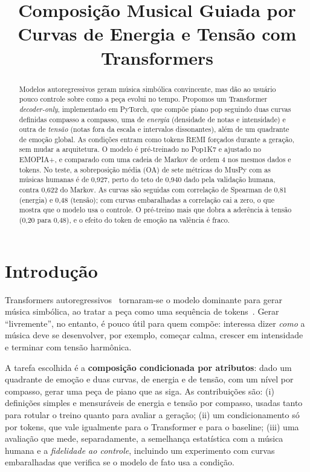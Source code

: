 \documentclass{article}
\title{Composição Musical Guiada por Curvas de Energia e Tensão com Transformers}
\begin{document}
\maketitle

\begin{abstract}
Modelos autoregressivos geram música simbólica convincente, mas dão ao usuário pouco controle sobre como a peça evolui no tempo. Propomos um Transformer \emph{decoder-only}, implementado em PyTorch, que compõe piano pop seguindo duas curvas definidas compasso a compasso, uma de \emph{energia} (densidade de notas e intensidade) e outra de \emph{tensão} (notas fora da escala e intervalos dissonantes), além de um quadrante de emoção global. As condições entram como tokens REMI forçados durante a geração, sem mudar a arquitetura. O modelo é pré-treinado no Pop1K7 e ajustado no EMOPIA+, e comparado com uma cadeia de Markov de ordem 4 nos mesmos dados e tokens. No teste, a sobreposição média (OA) de sete métricas do MusPy com as músicas humanas é de 0,927, perto do teto de 0,940 dado pela validação humana, contra 0,622 do Markov. As curvas são seguidas com correlação de Spearman de 0,81 (energia) e 0,48 (tensão); com curvas embaralhadas a correlação cai a zero, o que mostra que o modelo usa o controle. O pré-treino mais que dobra a aderência à tensão (0,20 para 0,48), e o efeito do token de emoção na valência é fraco.
\end{abstract}

\section{Introdução}\label{sec:introducao}

Transformers autoregressivos~\cite{vaswani2017} tornaram-se o modelo dominante para gerar música simbólica, ao tratar a peça como uma sequência de tokens~\cite{huang2019music,huang2020pop}. Gerar ``livremente'', no entanto, é pouco útil para quem compõe: interessa dizer \emph{como} a música deve se desenvolver, por exemplo, começar calma, crescer em intensidade e terminar com tensão harmônica.

A tarefa escolhida é a \textbf{composição condicionada por atributos}: dado um quadrante de emoção e duas curvas, de energia e de tensão, com um nível por compasso, gerar uma peça de piano que as siga. As contribuições são: (i) definições simples e mensuráveis de energia e tensão por compasso, usadas tanto para rotular o treino quanto para avaliar a geração; (ii) um condicionamento só por tokens, que vale igualmente para o Transformer e para o baseline; (iii) uma avaliação que mede, separadamente, a semelhança estatística com a música humana e a \emph{fidelidade ao controle}, incluindo um experimento com curvas embaralhadas que verifica se o modelo de fato usa a condição.
\end{document}
